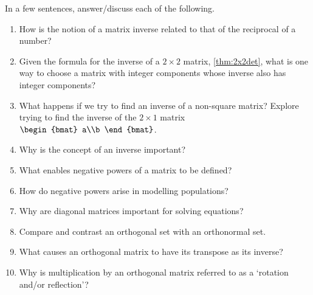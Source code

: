 \begin{exercise}  
In a few sentences, answer\slash discuss each of the following.
\begin{enumerate}
\item How is the notion of a matrix inverse related to that of the reciprocal of a number?

\item Given the formula for the inverse of a \(2\times 2\) matrix, \cref{thm:2x2det}, what is one way to choose a matrix with integer components whose inverse also has integer components?

\item What happens if we try to find an inverse of a non-square matrix?  
Explore trying to find the inverse of the \(2\times1\) matrix~\(\begin{bmat} a\\b \end{bmat}\).

\item Why is the concept of an inverse important?

\item What enables negative powers of a matrix to be defined?

\item How do negative powers arise in modelling populations?

\item Why are diagonal matrices important for solving equations?

\item Compare and contrast an orthogonal set with an orthonormal set.

\item What causes an orthogonal matrix to have its transpose as its inverse?

\item Why is multiplication by an orthogonal matrix referred to as a `rotation and/or reflection'?

\end{enumerate}
\end{exercise}

\begin{comment}%
why, what caused X?
how did X occur?
what-if? what-if-not?
how does X compare with Y?
what is the evidence for X?
why is X important?
\end{comment}














